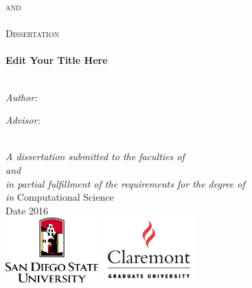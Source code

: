 \documentclass[11pt]{Thesis} %
\begin{document}
\begin{titlepage}
\begin{center}

\textsc{\LARGE \univname \hskip 0.1cm and \\[0cm]   \LARGE \univnamee }\\[1.3cm] %
\textsc{\Large Dissertation}\\[0.2cm] %

\HRule \\[0.3cm] %
{\huge \bfseries Edit Your Title Here} 
\\[0.4cm] %
\HRule \\[1.5cm] %
 
\begin{minipage}{0.4\textwidth}
\begin{flushleft} \large
\emph{Author:}\\
{\authornames} %
\end{flushleft}
\end{minipage}
\begin{minipage}{0.4\textwidth}
\begin{flushright} \large
\emph{Advisor:} \\
\href{http://www.jamessmith.com}
{\supname}
\end{flushright}
\end{minipage}\\[2cm]
 
\large \textit{A dissertation submitted to the faculties of \\[0.2cm] {\univname}  and \univnamee\\[0.2cm] in partial fulfillment of the requirements for the degree of }\\[0.3cm]  {\large \degreename}  \textit{in} \large{Computational Science}\\[2cm] %
 
{\large {Date 2016}}\\[2cm] %
\includegraphics[height=2.5cm]{sdsu.eps} \hskip 2cm \includegraphics[height=2.5cm]{cgu178.png}%
 

\end{center}
\end{titlepage}
\end{document}
